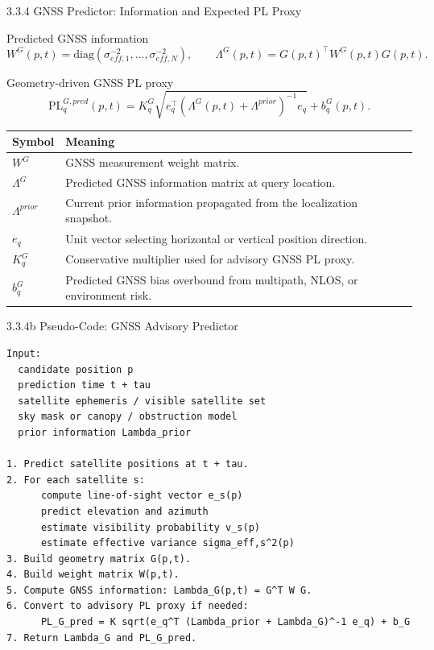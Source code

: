 \documentclass[10pt,aspectratio=169,xcolor=dvipsnames]{beamer}
\newcommand{\PL}{\mathrm{PL}}
\newcommand{\diag}{\mathrm{diag}}
\begin{document}
\begin{frame}{3.3.4 GNSS Predictor: Information and Expected PL Proxy}
  \small
  \begin{block}{Predicted GNSS information}
    \[
      W^G(p,t)=\diag\left(\sigma^{-2}_{eff,1},\ldots,\sigma^{-2}_{eff,N}\right),
      \qquad
      \Lambda^G(p,t)=G(p,t)^\top W^G(p,t)G(p,t).
    \]
  \end{block}

  \begin{block}{Geometry-driven GNSS PL proxy}
    \[
      \PL^{G,pred}_q(p,t)=
      K^G_q\sqrt{e_q^\top\left(\Lambda^G(p,t)+\Lambda^{prior}\right)^{-1}e_q}
      +b^G_q(p,t).
    \]
  \end{block}

  \begin{table}\scriptsize
    \begin{tabular}{p{} p{}}
      \toprule
      \textbf{Symbol} & \textbf{Meaning}\\
      \midrule
      $W^G$ & GNSS measurement weight matrix.\\
      $\Lambda^G$ & Predicted GNSS information matrix at query location.\\
      $\Lambda^{prior}$ & Current prior information propagated from the localization snapshot.\\
      $e_q$ & Unit vector selecting horizontal or vertical position direction.\\
      $K^G_q$ & Conservative multiplier used for advisory GNSS PL proxy.\\
      $b^G_q$ & Predicted GNSS bias overbound from multipath, NLOS, or environment risk.\\
      \bottomrule
    \end{tabular}
  \end{table}
\end{frame}

\begin{frame}[fragile]{3.3.4b Pseudo-Code: GNSS Advisory Predictor}
\begin{lstlisting}
Input:
  candidate position p
  prediction time t + tau
  satellite ephemeris / visible satellite set
  sky mask or canopy / obstruction model
  prior information Lambda_prior

1. Predict satellite positions at t + tau.
2. For each satellite s:
      compute line-of-sight vector e_s(p)
      predict elevation and azimuth
      estimate visibility probability v_s(p)
      estimate effective variance sigma_eff,s^2(p)
3. Build geometry matrix G(p,t).
4. Build weight matrix W(p,t).
5. Compute GNSS information: Lambda_G(p,t) = G^T W G.
6. Convert to advisory PL proxy if needed:
      PL_G_pred = K sqrt(e_q^T (Lambda_prior + Lambda_G)^-1 e_q) + b_G
7. Return Lambda_G and PL_G_pred.
\end{lstlisting}
\end{frame}
\end{document}
